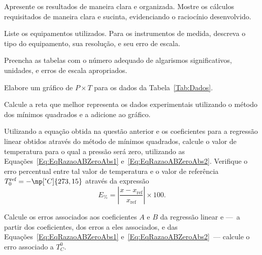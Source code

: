 \begin{question}[type={exam}]{1}
Apresente os resultados de maneira clara e organizada. Mostre os cálculos requisitados de maneira clara e sucinta, evidenciando o raciocínio desenvolvido.
\end{question}

\begin{question}[type={exam}]{1}
Liste os equipamentos utilizados. Para os instrumentos de medida, descreva o tipo do equipamento, sua resolução, e seu erro de escala.
\end{question}

\begin{question}[type={exam}]{1}
Preencha as tabelas com o número adequado de algarismos significativos, unidades, e erros de escala apropriados. 
\end{question}

\begin{question}[type={exam}]{1.5}
Elabore um gráfico de $P \times T$ para os dados da Tabela~\ref{Tab:Dados}.
\end{question}

\begin{question}[type={exam}]{1}
Calcule a reta que melhor representa os dados experimentais utilizando o método dos mínimos quadrados e a adicione ao gráfico.
\end{question}

\begin{question}[type={exam}]{1}
Utilizando a equação obtida na questão anterior e os coeficientes para a regressão linear obtidos através do método de mínimos quadrados, calcule o valor de temperatura para o qual a pressão será zero, utilizando as Equações~\ref{Eq:EqRazaoABZeroAbs1} e~\ref{Eq:EqRazaoABZeroAbs2}. Verifique o erro percentual entre tal valor de temperatura e o valor de referência $T_0^{\textrm{ref}} = -\np[\tcdegree C]{273,15}$ através da expressão
\begin{equation}
	E_{\%} = \left|\frac{x-x_{\textrm{ref}}}{x_{\textrm{ref}}}\right| \times 100.
\end{equation}
\end{question}

\begin{question}[type={exam}]{2}
Calcule os erros associados aos coeficientes $A$ e $B$ da regressão linear e ---~a partir dos coeficientes, dos erros a eles associados, e das Equações~\ref{Eq:EqRazaoABZeroAbs1} e~\ref{Eq:EqRazaoABZeroAbs2}~---  calcule o erro associado a $T_C^0$.
\end{question}

